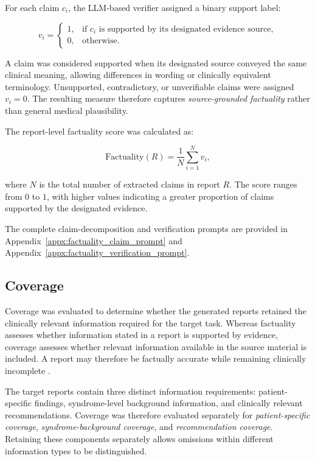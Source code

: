 \documentclass[ %
                    author={Aman Kumar Singh},
                supervisor={Dr. Edwin Simpson},
                    degree={MSc},
                     title={Quality-Aware Knowledge Distillation of Large Language Models for Efficient Personalised Clinical Report Generation},
                  subtitle={},
                      type={},
                      year={2021}]{dissertation}
\begin{document}
For each claim $c_i$, the LLM-based verifier assigned a binary support label:

\begin{equation}
v_i =
\begin{cases}
1, & \text{if } c_i \text{ is supported by its designated evidence source},\\
0, & \text{otherwise}.
\end{cases}
\end{equation}

A claim was considered supported when its designated source conveyed the
same clinical meaning, allowing differences in wording or clinically
equivalent terminology. Unsupported, contradictory, or unverifiable claims
were assigned $v_i=0$. The resulting measure therefore captures
\textit{source-grounded factuality} rather than general medical plausibility.

The report-level factuality score was calculated as:

\begin{equation}
\mathrm{Factuality}(R)
=
\frac{1}{N}\sum_{i=1}^{N}v_i,
\end{equation}

where $N$ is the total number of extracted claims in report $R$. The score
ranges from $0$ to $1$, with higher values indicating a greater proportion
of claims supported by the designated evidence.

The complete claim-decomposition and verification prompts are provided in
Appendix~\ref{appx:factuality_claim_prompt} and Appendix~\ref{appx:factuality_verification_prompt}.
\subsection{Coverage}
\label{sec:coverage}

Coverage was evaluated to determine whether the generated reports retained
the clinically relevant information required for the target task. Whereas
factuality assesses whether information stated in a report is supported by
evidence, coverage assesses whether relevant information available in the
source material is included. A report may therefore be factually accurate
while remaining clinically incomplete \cite{
song_finesure_2024}.

The target reports contain three distinct information requirements:
patient-specific findings, syndrome-level background information, and
clinically relevant recommendations. Coverage was therefore evaluated
separately for \textit{patient-specific coverage},
\textit{syndrome-background coverage}, and
\textit{recommendation coverage}. Retaining these components separately
allows omissions within different information types to be distinguished.
\end{document}
